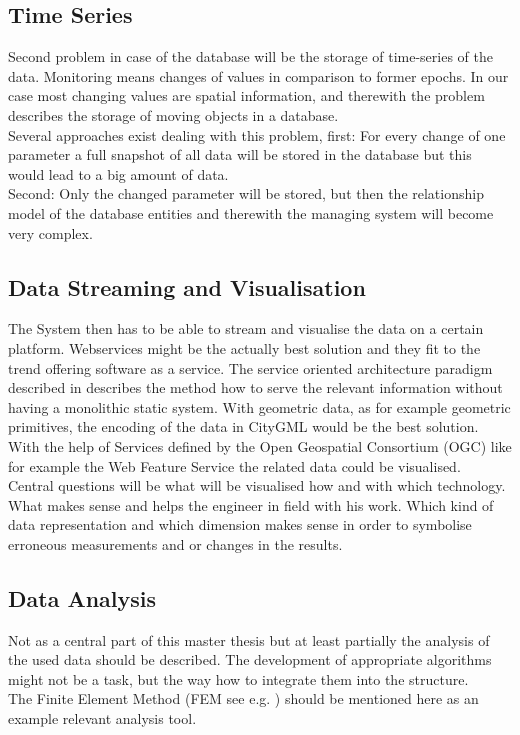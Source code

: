 \subsection{Time Series}
Second problem in case of the database will be the storage of time-series of the data. Monitoring means changes of values in comparison to former epochs. In our case most changing values are spatial information, and therewith the problem describes the storage of moving objects in a database.\\
Several approaches exist dealing with this problem, first: For every change of one parameter a full snapshot of all data will be stored in the database but this would lead to a big amount of data.\\
Second: Only the changed parameter will be stored, but then the relationship model of the database entities and therewith the managing system will become very complex. \citep{erwig_spatio-temporal_1999}\citep{koubarakis_spatio-temporal_2003}\citep{yuan_temporal_1996}
\subsection{Data Streaming and Visualisation}
The System then has to be able to stream and visualise the data on a certain platform. Webservices might be the actually best solution and they fit to the trend offering software as a service. The service oriented architecture paradigm described in \citep{papazoglou_web_2008} describes the method how to serve the relevant information without having a monolithic static system. With geometric data, as for example geometric primitives, the encoding of the data in CityGML \citep{gerhard_groger_ogc_2012}\citep{kolbe_3d-geo-database_2009} would be the best solution. With the help of Services defined by the Open Geospatial Consortium (OGC) like for example the Web Feature Service \citep{panagiotis_a._vretanos_opengis_2005} \citep{jeff_de_la_beaujardiere_opengis_2006}\citep{douglas_nebert_opengis_2007}\citep{panagiotis_a._vretanos_opengis_2010}\citep{kolbe_draft_2009} the related data could be visualised.\\
Central questions will be what will be visualised how and with which technology. What makes sense and helps the engineer in field with his work. Which kind of data representation and which dimension makes sense in order to symbolise erroneous measurements and or changes in the results.
\subsection{Data Analysis}
Not as a central part of this master thesis but at least partially the analysis of the used data should be described. The development of appropriate algorithms might not be a task, but the way how to integrate them into the structure.\\
The Finite Element Method  (FEM see e.g. \citep{zienkiewicz_finite_1977}) should be mentioned here as an example relevant analysis tool.
